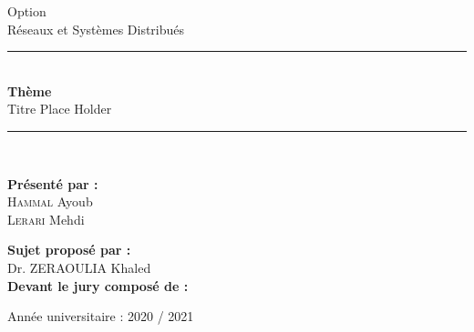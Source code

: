 \documentclass[a4paper,12pt]{article}
\newcommand{\HRule}{\rule{\linewidth}{0.5mm}}
\begin{document}
\begin{titlepage}
\begin{center}
{Option}\\
\Large
Réseaux et Systèmes Distribués\\
\HRule \\[0.4cm]
{ \huge {\bfseries Thème}\\
	Titre Place Holder\\[0.4cm] }
\HRule \\[2cm]
\normalsize
\begin{minipage}{0.45\textwidth}
\begin{flushleft} 
\large
{\bfseries Présenté par :}\\
\textsc{Hammal} Ayoub\\
\textsc{Lerari} Mehdi
\end{flushleft}
\end{minipage}
\begin{minipage}{0.45\textwidth}
\begin{flushright} 
\large
{\bfseries Sujet proposé par :}\\
Dr. \textsc{ZERAOULIA} Khaled\\[1.5cm]
{\bfseries Devant le jury composé de :}\\
\end{flushright}
\end{minipage}

\vfill

{\large Année universitaire : 2020 / 2021}

\end{center}
\end{titlepage}
\end{document}

